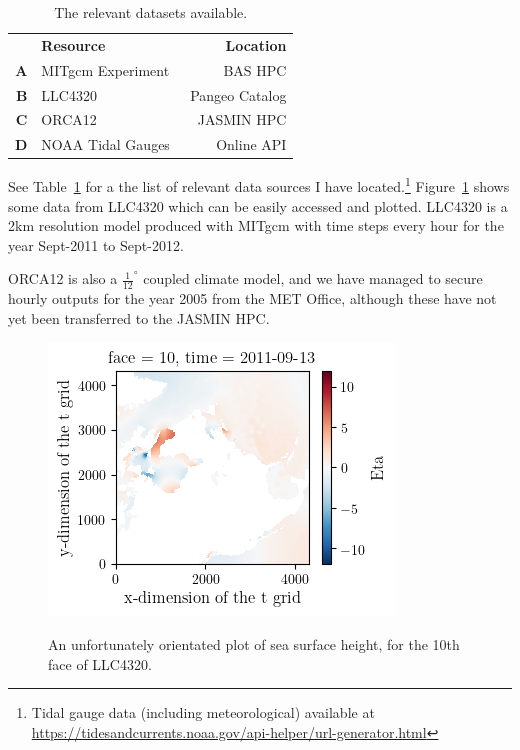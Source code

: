 \documentclass[usenames, dvipsnames, twocolumn]{article}
\begin{document}
\begin{table}[htb!]
    \centering
    \begin{tabular}{rlr}
                 & \textbf{Resource} & \textbf{Location} \\
        \textbf{A} & MITgcm Experiment~\cite{marshall1998efficient, marotzke1999construction}\footnotemark & BAS HPC \\
        \textbf{B} & LLC4320~\cite{Abernathey2017} & Pangeo Catalog\\
        \textbf{C} & ORCA12~\cite{treguier2017orca12} & JASMIN HPC \\
        \textbf{D} & NOAA Tidal Gauges & Online API  \\
    \end{tabular}
    \caption{The relevant datasets available.}
    \label{tab:data_sources}
\end{table}
See Table~\ref{tab:data_sources} for a the list of relevant data sources I have
 located.\footnote{Tidal gauge data (including meteorological) available at
  \url{https://tidesandcurrents.noaa.gov/api-helper/url-generator.html}}
   Figure~\ref{fig:tile10} shows some data from LLC4320 which can be easily
    accessed and plotted. LLC4320 is a 2km resolution model produced with MITgcm
     with time steps every hour for the year Sept-2011 to Sept-2012.

ORCA12 is also a \(\frac{1}{12}^{\circ}\) coupled climate model,
 and we have managed to secure hourly outputs for the year 2005 from the MET Office,
  although these have not yet been transferred to the JASMIN HPC.

\begin{figure}[htb!]
    \centering
    \includegraphics[width=0.8\linewidth]{images/proposal/tile10.png}\\
    \caption{An unfortunately orientated plot of sea surface height,
     for the 10th face of LLC4320.}
    \label{fig:tile10}
\end{figure}
\end{document}
